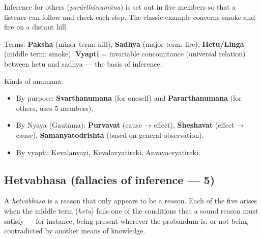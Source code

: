 Inference for others (\emph{parārthānumāna}) is set out in five members so that a listener can follow and check
each step. The classic example concerns smoke and fire on a distant hill.



Terms: \textbf{Paksha} (minor term: hill), \textbf{Sadhya} (major term: fire), \textbf{Hetu/Linga} (middle term: smoke).
\textbf{Vyapti} = invariable concomitance (universal relation) between hetu and sadhya --- the basis of inference.

Kinds of anumana:

\begin{itemize}
\tightlist
\item
  By purpose: \textbf{Svarthanumana} (for oneself) and \textbf{Pararthanumana} (for others, uses 5 members).
\item
  By Nyaya (Gautama): \textbf{Purvavat} (cause → effect), \textbf{Sheshavat} (effect → cause), \textbf{Samanyatodrishta} (based on general observation).
\item
  By vyapti: Kevalanvayi, Kevalavyatireki, Anvaya-vyatireki.
\end{itemize}

\needspace{160pt}

\hypertarget{p1-06--hetvabhasa-fallacies-of-inference--5}{%
\subsection{Hetvabhasa (fallacies of inference --- 5)}\label{p1-06--hetvabhasa-fallacies-of-inference--5}}

A \emph{hetvābhāsa} is a reason that only appears to be a reason. Each of the five arises when the middle term
(\emph{hetu}) fails one of the conditions that a sound reason must satisfy --- for instance, being present
wherever the probandum is, or not being contradicted by another means of knowledge.

\begingroup\small


